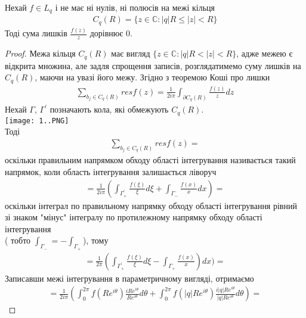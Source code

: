 \documentclass[12pt,a4paper]{article}
\begin{document}
 
\begin{thm}
 Нехай $f\in L_{q}$ і не має ні нулів, ні полюсів на межі кільця 
\begin{equation}\label{th21}
\begin{array}{l}
C_{q}(R)=\lbrace z\in \mathbb{C}:\left |q  \right |R\leq \left |z  \right |<R \rbrace
\end{array}
\end{equation} 
 Тоді сума лишків $\frac{f(z)}{z}$ дорівнює $0$.
\end{thm}
\begin{proof}
 Межа кільця $C_{q}(R)$ має вигляд $\lbrace z\in \mathbb{C}:\left |q  \right |R< \left |z  \right |<R \rbrace$, адже межею є відкрита множина, але задля спрощення записів, розглядатимемо суму лишків на $C_{q}(R)$, маючи на увазі його межу. Згідно з теоремою Коші про лишки
 \[\begin{array}{l}
\sum_{b_{j}\in C_{q}(R)}^{ } resf(z)= \frac{1}{2i\pi}\int_{\partial C_{q}(R)}^{ } \frac{f(z)}{z}dz
\end{array} \]
Нехай $\Gamma$, $\Gamma^{'}$ позначають кола, які обмежують $C_{q}(R)$.\\
\texttt{[image: 1..PNG]}\\
Тоді 
\[\begin{array}{l}
\sum_{b_{j} \in C_{q}(R)}^{ } resf(z) = 
\end{array} \]
оскільки правильним напрямком обходу області інтегрування називається такий
напрямок, коли область інтегрування залишається ліворуч 
\[\begin{array}{l}
= \frac{1}{2i\pi} (\int_{\Gamma^{'}_{+}}^{ }\frac{f(\xi)}{\xi}d\xi  + \int_{\Gamma_{-}}^{ }\frac{f(x)}{x}dx)=
\end{array} \]
оскільки інтеграл по правильному напрямку обходу області інтегрування рівний зі знаком "мінус" інтегралу по протилежному напрямку обходу області інтегрування\\
( тобто $\int_{\Gamma_{-}}^{ }= - \int_{\Gamma_{+}}^{ }$), тому 
\[\begin{array}{l}
=\frac{1}{2\pi}(\int_{\Gamma^{'}_{+}}^{ } \frac{f(\xi)}{\xi}d\xi - \int_{\Gamma_{+}}^{ }\frac{f(x)}{x})dx)=
\end{array} \]
 Записавши межі інтегрування в параметричному вигляді, отримаємо 
 \[\begin{array}{l}
 = \frac{1}{2i\pi}(\int_{0}^{2\pi }f(Re^{i\theta})\frac{iRe^{i\theta}}{Re^{i\theta }}d\theta  + \int_{0}^{2\pi }f(\left |q \right |Re^{i\theta })\frac{i\left |q \right |Re^{i\theta }}{\left |q \right |Re^{i\theta }}d\theta)=

\end{array}\]
\end{proof}
\end{document}
